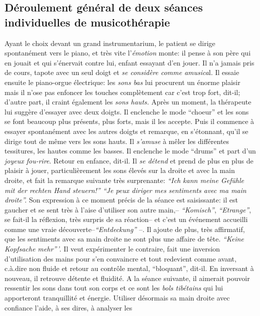 \subsection{Déroulement général de deux séances individuelles de musicothérapie} 
Ayant le choix devant un grand instrumentarium,
le patient se dirige spontanément vers le piano, et très vite
l'\textit{émotion} monte: il pense à son père qui en jouait et qui
s'énervait contre lui, enfant essayant d'en
jouer. Il n'a jamais pris de cours, tapote avec un seul doigt et \textit{se considère comme
	amusica}l. Il essaie ensuite le piano-orgue  électrique: les \textit{sons bas}
lui procurent un énorme plaisir mais il n'ose pas enfoncer les touches
complètement car c'est trop fort, dit-il; d'autre part, il
craint également les
\textit{sons hauts.}
Après un moment, la thérapeute lui suggère d'essayer avec deux doigts.
Il enclenche le mode ``choeur'' et les sons se font beaucoup
plus présents, plus forts, mais il les accepte. Puis il commence à essayer spontanément
avec les autres doigts et remarque,  en s'étonnant, qu'il se
dirige tout de même vers les sons
hauts. Il \textit{s'amuse} à mêler les différentes tessitures,
les hautes comme les basses.
Il enclenche le mode ``drums'' et part d'un\textit{ joyeux
	fou-rire}. Retour en enfance, dit-il.
Il \textit{se détend} et prend de plus en plus de plaisir à jouer, particulièrement  les sons élevés
sur la droite et avec la main droite, et fait
la remarque suivante très surprenante:
\textit{``Ich kann meine Gefühle mit der rechten Hand steuern!''
	``Je peux diriger mes sentiments avec ma main droite''.}
Son expression à ce moment précis de la séance est saisissante: il
est gaucher et se sent très à l'aise d'utiliser son autre
main,-- \textit{``Komisch''},  \textit{``Etrange''}, se fait-il
la réflexion, très surpris de sa réaction-- et c'est un événement
accueilli comme une vraie
découverte--\textit{``Entdeckung''} --.
Il ajoute de plus, très affirmatif, que les sentiments avec sa main
droite ne sont plus une affaire de tête. \textit{``Keine
	Kopfsache mehr'''}. Il veut expérimenter le contraire, fait
une inversion d'utilisation des mains pour s'en convaincre et tout redevient comme
avant, c.à.dire non fluide et retour au contrôle
	mental,
``bloquant'', dit-il. En inversant à nouveau, il retrouve
détente et fluidité.
A la séance suivante, il aimerait pouvoir ressentir
les sons dans tout son corps et ce sont les\textit{ bols
	tibétains } qui lui
apporteront tranquillité et
énergie. Utiliser désormais sa main
droite avec confiance l'aide, à ses dires, à analyser les
